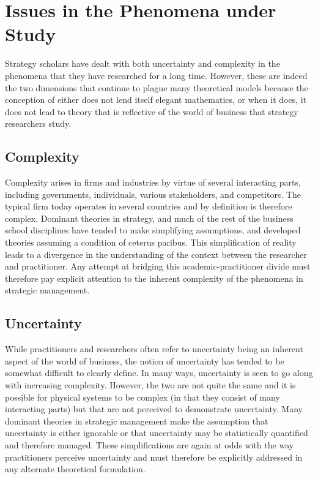 \documentclass[12pt]{article}
\begin{document}
\section{Issues in the Phenomena under Study}
Strategy scholars have dealt with both uncertainty and complexity in the phenomena that they have researched for a long time. However, these are indeed the two dimensions that continue to plague many theoretical models because the conception of either does not lend itself elegant mathematics, or when it does, it does not lead to theory that is reflective of the world of business that strategy researchers study. 
\subsection{Complexity}
Complexity arises in firms and industries by virtue of several interacting parts, including governments, individuals, various stakeholders, and competitors. The typical firm today operates in several countries and by definition is therefore complex. Dominant theories in strategy, and much of the rest of the business school disciplines have tended to make simplifying assumptions, and developed theories assuming a condition of ceterus paribus. This simplification of reality leads to a divergence in the understanding of the context between the researcher and practitioner. Any attempt at bridging this academic-practitioner divide must therefore pay explicit attention to the inherent complexity of the phenomena in strategic management.
\subsection{Uncertainty}
While practitioners and researchers often refer to uncertainty being an inherent aspect of the world of business, the notion of uncertainty has tended to be somewhat difficult to clearly define. In many ways, uncertainty is seen to go along with increasing complexity. However, the two are not quite the same and it is possible for physical systems to be complex (in that they consist of many interacting parts) but that are not perceived to demonstrate uncertainty. Many dominant theories in strategic management make the assumption that uncertainty is either ignorable or that uncertainty may be statistically quantified and therefore managed. These simplifications are again at odds with the way practitioners perceive uncertainty and must therefore be explicitly addressed in any alternate theoretical formulation.
\end{document}
